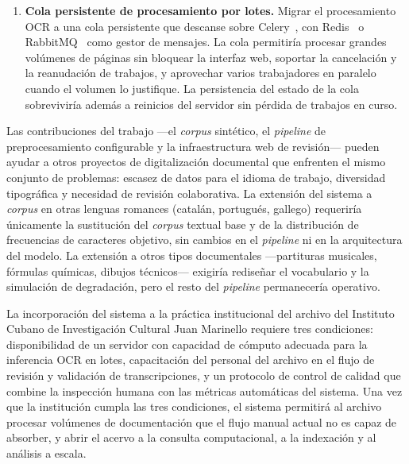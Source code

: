 \begin{enumerate}[leftmargin=*,labelsep=0.5em]
	\item \textbf{Cola persistente de procesamiento por lotes.} Migrar el procesamiento OCR a una cola persistente que descanse sobre Celery~\cite{celery}, con Redis~\cite{redis} o RabbitMQ~\cite{rabbitmq} como gestor de mensajes. La cola permitiría procesar grandes volúmenes de páginas sin bloquear la interfaz web, soportar la cancelación y la reanudación de trabajos, y aprovechar varios trabajadores en paralelo cuando el volumen lo justifique. La persistencia del estado de la cola sobreviviría además a reinicios del servidor sin pérdida de trabajos en curso.
\end{enumerate}

Las contribuciones del trabajo —el \textit{corpus} sintético, el \textit{pipeline} de preprocesamiento configurable y la infraestructura web de revisión— pueden ayudar a otros proyectos de digitalización documental que enfrenten el mismo conjunto de problemas: escasez de datos para el idioma de trabajo, diversidad tipográfica y necesidad de revisión colaborativa. La extensión del sistema a \textit{corpus} en otras lenguas romances (catalán, portugués, gallego) requeriría únicamente la sustitución del \textit{corpus} textual base y de la distribución de frecuencias de caracteres objetivo, sin cambios en el \textit{pipeline} ni en la arquitectura del modelo. La extensión a otros tipos documentales —partituras musicales, fórmulas químicas, dibujos técnicos— exigiría rediseñar el vocabulario y la simulación de degradación, pero el resto del \textit{pipeline} permanecería operativo.

La incorporación del sistema a la práctica institucional del archivo del Instituto Cubano de Investigación Cultural Juan Marinello requiere tres condiciones: disponibilidad de un servidor con capacidad de cómputo adecuada para la inferencia OCR en lotes, capacitación del personal del archivo en el flujo de revisión y validación de transcripciones, y un protocolo de control de calidad que combine la inspección humana con las métricas automáticas del sistema. Una vez que la institución cumpla las tres condiciones, el sistema permitirá al archivo procesar volúmenes de documentación que el flujo manual actual no es capaz de absorber, y abrir el acervo a la consulta computacional, a la indexación y al análisis a escala.

